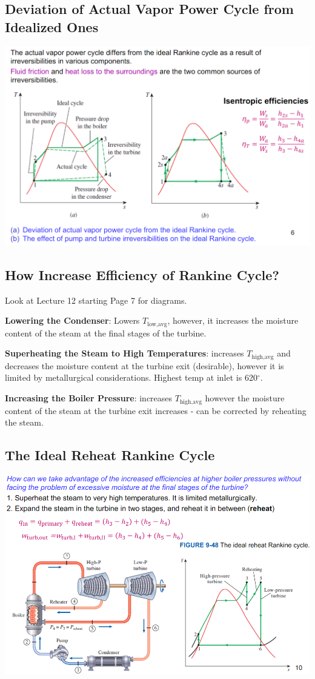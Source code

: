 \documentclass{article}
\begin{document}
\begin{multicols}{3}
    \subsection*{Deviation of Actual Vapor Power Cycle from Idealized Ones}
    \includegraphics[width=\linewidth]{Images/non_deal_vapor.png}
    \subsection*{How Increase Efficiency of Rankine Cycle?}
    Look at Lecture 12 starting Page 7 for diagrams.\par
    \textbf{Lowering the Condenser}: Lowers $T_{\text{low,avg}}$, however, it increases the moisture content of the steam at the final stages of the turbine.\par 
    \textbf{Superheating the Steam to High Temperatures}: increases $T_\text{high,avg}$ and decreases the moisture content at the turbine exit (desirable), however it is limited by metallurgical considerations. Highest temp at inlet is 620$^\circ$.\par 
    \textbf{Increasing the Boiler Pressure}: increases $T_\text{high,avg}$ however the moisture content of the steam at the turbine exit increases - can be corrected by reheating the steam.
    \subsection*{The Ideal Reheat Rankine Cycle}
    \includegraphics[width=\linewidth]{Images/reheat_rankine.png}

\end{multicols}
\end{document}
